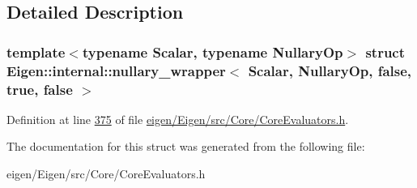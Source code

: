 \subsection{Detailed Description}
\subsubsection*{template$<$typename Scalar, typename Nullary\+Op$>$\newline
struct Eigen\+::internal\+::nullary\+\_\+wrapper$<$ Scalar, Nullary\+Op, false, true, false $>$}



Definition at line \hyperlink{eigen_2_eigen_2src_2_core_2_core_evaluators_8h_source_l00375}{375} of file \hyperlink{eigen_2_eigen_2src_2_core_2_core_evaluators_8h_source}{eigen/\+Eigen/src/\+Core/\+Core\+Evaluators.\+h}.



The documentation for this struct was generated from the following file\+:\begin{DoxyCompactItemize}
\item 
eigen/\+Eigen/src/\+Core/\+Core\+Evaluators.\+h\end{DoxyCompactItemize}
